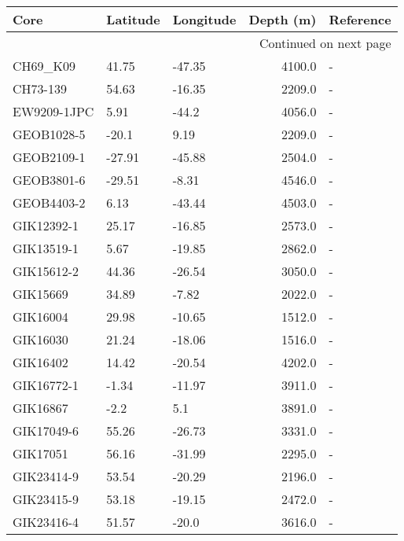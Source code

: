 \begin{longtable}{lllrl}

         Core & Latitude & Longitude &  Depth (m) & Reference \\

\endhead

\multicolumn{5}{r}{{Continued on next page}} \\

\endfoot


\endlastfoot
     CH69\_K09 &    41.75 &    -47.35 &     4100.0 &         - \\
     CH73-139 &    54.63 &    -16.35 &     2209.0 &         - \\
  EW9209-1JPC &     5.91 &     -44.2 &     4056.0 &         - \\
   GEOB1028-5 &    -20.1 &      9.19 &     2209.0 &         - \\
   GEOB2109-1 &   -27.91 &    -45.88 &     2504.0 &         - \\
   GEOB3801-6 &   -29.51 &     -8.31 &     4546.0 &         - \\
   GEOB4403-2 &     6.13 &    -43.44 &     4503.0 &         - \\
   GIK12392-1 &    25.17 &    -16.85 &     2573.0 &         - \\
   GIK13519-1 &     5.67 &    -19.85 &     2862.0 &         - \\
   GIK15612-2 &    44.36 &    -26.54 &     3050.0 &         - \\
     GIK15669 &    34.89 &     -7.82 &     2022.0 &         - \\
     GIK16004 &    29.98 &    -10.65 &     1512.0 &         - \\
     GIK16030 &    21.24 &    -18.06 &     1516.0 &         - \\
     GIK16402 &    14.42 &    -20.54 &     4202.0 &         - \\
   GIK16772-1 &    -1.34 &    -11.97 &     3911.0 &         - \\
     GIK16867 &     -2.2 &       5.1 &     3891.0 &         - \\
   GIK17049-6 &    55.26 &    -26.73 &     3331.0 &         - \\
     GIK17051 &    56.16 &    -31.99 &     2295.0 &         - \\
   GIK23414-9 &    53.54 &    -20.29 &     2196.0 &         - \\
   GIK23415-9 &    53.18 &    -19.15 &     2472.0 &         - \\
   GIK23416-4 &    51.57 &     -20.0 &     3616.0 &         - \\

\end{longtable}
